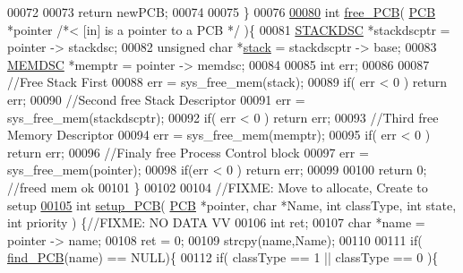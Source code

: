\begin{DoxyCode}
00072         
00073         \textcolor{keywordflow}{return} newPCB;
00074         
00075 \}
00076 
\hypertarget{mpx__r2_8c_source_l00080}{}\hyperlink{mpx__r2_8h_a79890f055b1d0fccf1962bbde4877caa}{00080} \textcolor{keywordtype}{int} \hyperlink{mpx__r2_8c_a79890f055b1d0fccf1962bbde4877caa}{free_PCB}( \hyperlink{structprocess}{PCB} *pointer \textcolor{comment}{/*< [in] is a pointer to a PCB  */} )\{
00081         \hyperlink{structstack}{STACKDSC} *stackdscptr = pointer -> stackdsc;
00082         \textcolor{keywordtype}{unsigned} \textcolor{keywordtype}{char} *\hyperlink{structstack}{stack} = stackdscptr -> base;
00083         \hyperlink{structmem}{MEMDSC} *memptr = pointer -> memdsc;
00084         
00085         \textcolor{keywordtype}{int} err;
00086         
00087         \textcolor{comment}{//Free Stack First}
00088         err = sys\_free\_mem(stack);
00089         \textcolor{keywordflow}{if}( err < 0 ) \textcolor{keywordflow}{return} err;
00090         \textcolor{comment}{//Second free Stack Descriptor}
00091         err = sys\_free\_mem(stackdscptr);
00092         \textcolor{keywordflow}{if}( err < 0 ) \textcolor{keywordflow}{return} err;
00093         \textcolor{comment}{//Third free Memory Descriptor}
00094         err = sys\_free\_mem(memptr);
00095         \textcolor{keywordflow}{if}( err < 0 ) \textcolor{keywordflow}{return} err;
00096         \textcolor{comment}{//Finaly free Process Control block}
00097         err = sys\_free\_mem(pointer);
00098         \textcolor{keywordflow}{if}(err < 0 ) \textcolor{keywordflow}{return} err;
00099         
00100         \textcolor{keywordflow}{return} 0; \textcolor{comment}{//freed mem ok}
00101 \}
00102 
00104 \textcolor{comment}{//FIXME: Move to allocate, Create to setup}
\hypertarget{mpx__r2_8c_source_l00105}{}\hyperlink{mpx__r2_8h_a48d816fd79ba99118f2dff84d84395f5}{00105} \textcolor{keywordtype}{int} \hyperlink{mpx__r2_8c_a316c9619aba53c03c17afbc0a0dbf096}{setup_PCB}( \hyperlink{structprocess}{PCB} *pointer, \textcolor{keywordtype}{char} *Name, \textcolor{keywordtype}{int} classType, \textcolor{keywordtype}{int} state, \textcolor{keywordtype}{int} priority )
      \{\textcolor{comment}{//FIXME: NO DATA VV}
00106         \textcolor{keywordtype}{int} ret; 
00107         \textcolor{keywordtype}{char} *name = pointer -> name;
00108         ret = 0; 
00109         strcpy(name,Name); 
00110         
00111         \textcolor{keywordflow}{if}( \hyperlink{mpx__r2_8c_a612a6abcb66c688a32f33abc93ff3990}{find_PCB}(name) == NULL)\{ 
00112                 \textcolor{keywordflow}{if}( classType == 1 || classType == 0 )\{

\end{DoxyCode}

